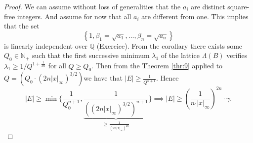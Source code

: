 \documentclass[a4paper,11pt,american]{article}
\newcommand{\N}{\mathbb{N}}
\newcommand{\Q}{\mathbb{Q}}
\theoremstyle{plain}
\theoremstyle{definition}
\begin{document}
\begin{proof}
  We can assume without loss of generalities that the $a_i$ are distinct square-free integers. And assume for now that all $a_i$ are different from one. This implies that the set
  \begin{displaymath}
    \left\{1, \beta_1 = \sqrt{a_1} ,\dots, \beta_n = \sqrt{a_n}\right\} 
  \end{displaymath}
  is linearly independent over $\Q$ (Exercice).
  From the corollary there exists some $Q_0 \in \N_+$ such that the first successive minimum $\lambda_1$ of the lattice $\Lambda(B)$ verifies $\lambda_1 \geq 1/Q^{1 + \frac{1}{3n}}$ for all $Q \geq Q_0$. 
Then from the Theorem \ref{thr:9} applied to $Q = (Q_0 \cdot (2n\vert  x\vert _\infty)^{3/2})$we have that $\vert E\vert \geq \frac{1}{Q^{n+1}}$. Hence $$\vert E\vert\geq\min\{\frac{1}{Q_0^{n+1}},\underbrace{\frac{1}{(\left(2 n \vert x\vert _\infty\right)^{3/2})^{n+1}}}_{\geq\frac{1}{(2 n \vert x\vert _\infty)^{2n}}}\}\implies \vert E\vert  \geq  \left( \frac{1}{n \cdot \vert x\vert _\infty}\right)^{2n} \cdot \gamma.$$ 

\end{proof}
\end{document}
